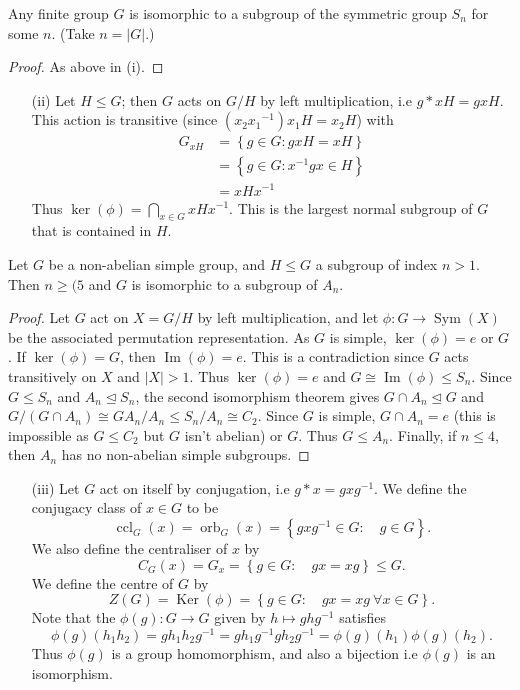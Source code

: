 \documentclass[egregdoesnotlikesansseriftitles,a4paper]{scrartcl}
\begin{document}
 \begin{theorem}
     Any finite group $G$ is isomorphic to a subgroup of the symmetric group $S_{n}$ for some $n$. (Take $n=|G|$.)
 \end{theorem}
 \begin{proof}
       As above in (i).
 \end{proof}
 \begin{itemize}
      \item[(ii)] Let $H \leq G$; then $G$ acts on $G/H$ by left multiplication, i.e $g \ast x H= gxH$. This action is transitive (since $(x_2 {x_1 }^{-1})x_1 H=x_2 H$) with 
      \begin{align*}
          G_{xH}&=\left\{g \in G: gxH=xH\right\}\\&=\left\{g \in G: {x}^{-1}gx \in H\right\}\\&=xH {x}^{-1} 
      \end{align*} Thus $\operatorname{ker}(\phi)=\bigcap_{x \in G}xH {x}^{-1}$. This is the largest normal subgroup of $G$ that is contained in $H$.  
 \end{itemize}
 \begin{theorem}
       Let $G$ be a non-abelian simple group, and $H \leq G$ a subgroup of index $n>1$. Then $n \geq (5$ and $G$ is isomorphic to a subgroup of $A_{n}$.
 \end{theorem}
 \begin{proof}
     Let $G$ act on $X=G/H$ by left multiplication, and let $\phi: G \rightarrow \operatorname{Sym}(X)$ be the associated permutation representation. As $G$ is simple, $\operatorname{ker}(\phi)=e$ or $G$. If $\operatorname{ker}(\phi)=G$, then $\operatorname{Im}(\phi)=e$. This is a contradiction since $G$ acts transitively on $X$ and $|X|>1$. Thus $\operatorname{ker}(\phi)=e$ and $G \cong \operatorname{Im}(\phi) \leq S_{n}.$ Since $G \leq S_{n}$ and $A_n \unlhd S_n$, the second isomorphism theorem gives $G \cap A_n \unlhd G$ and $G/(G \cap A_n) \cong GA_n/A_n \leq S_n / A_n \cong C_2 $. Since $G$ is simple, $G \cap A_n=e$ (this is impossible as $G \leq C_2 $ but $G$ isn't abelian) or $G$. Thus $G \leq A_{n} $. Finally, if $n \leq 4$, then $A_n$ has no non-abelian simple subgroups.
 \end{proof}
\begin{itemize}
     \item[(iii)] Let $G$ act on itself by conjugation, i.e $g \ast x= gx {g}^{-1}$. We define the conjugacy class of $x \in G$ to be \[
     \operatorname{ccl}_G (x)=\operatorname{orb}_{G}(x)=\left\{gx {g}^{-1} \in G: \quad g \in G\right\}
     .\] We also define the centraliser of $x$ by \[
     C_{G}(x)=G_{x}= \left\{g \in G: \quad gx=xg\right\} \leq G
     .\] We define the centre of $G$ by \[
     Z (G)=\operatorname{Ker}(\phi)=\left\{g \in G: \quad gx=xg \ \forall x \in G\right\}
     .\] Note that the $\phi (g): G \rightarrow G$ given by $h \mapsto gh {g}^{-1}$ satisfies \[
     \phi (g)(h_1 h_2 )=gh_1 h_2 {g}^{-1}=gh_1 {g}^{-1} gh_2 {g}^{-1} =\phi (g)(h_1 )\phi (g)(h_2 )
     .\]  Thus $\phi (g)$ is a group homomorphism, and also a bijection i.e $\phi (g)$ is an isomorphism. 
\end{itemize}
\end{document}
